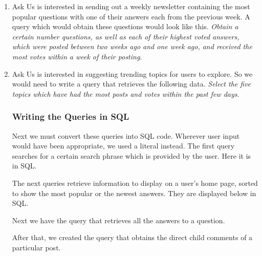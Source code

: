 \begin{enumerate}
	\item
	Ask Us is interested in sending out a weekly newsletter containing the most popular questions with one of their answers each from the previous week. A query which would obtain these questions would look like this. \emph{Obtain a certain number questions, as well as each of their highest voted answers, which were posted between two weeks ago and one week ago, and received the most votes within a week of their posting}.

	\item
	Ask Us is interested in suggesting trending topics for users to explore. So we would need to write a query that retrieves the following data. \emph{Select the five topics which have had the most posts and votes within the past few days}.

	\subsubsection{Writing the Queries in SQL}

	Next we must convert these queries into SQL code. Wherever user input would have been appropriate, we used a literal instead. The first query searches for a certain search phrase which is provided by the user. Here it is in SQL.


	The next queries retrieve information to display on a user's home page, sorted to show the most popular or the newest answers. They are displayed below in SQL.


	Next we have the query that retrieves all the answers to a question.


	After that, we created the query that obtains the direct child comments of a particular post.





\end{enumerate}
